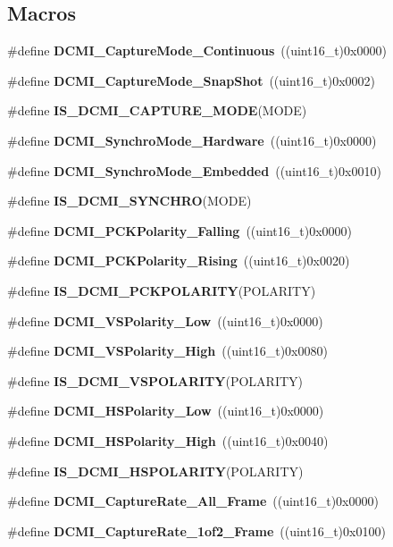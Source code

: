 \subsection*{Macros}
\begin{DoxyCompactItemize}
\item 
\#define \textbf{ D\+C\+M\+I\+\_\+\+Capture\+Mode\+\_\+\+Continuous}~((uint16\+\_\+t)0x0000)
\item 
\#define \textbf{ D\+C\+M\+I\+\_\+\+Capture\+Mode\+\_\+\+Snap\+Shot}~((uint16\+\_\+t)0x0002)
\item 
\#define \textbf{ I\+S\+\_\+\+D\+C\+M\+I\+\_\+\+C\+A\+P\+T\+U\+R\+E\+\_\+\+M\+O\+DE}(M\+O\+DE)
\item 
\#define \textbf{ D\+C\+M\+I\+\_\+\+Synchro\+Mode\+\_\+\+Hardware}~((uint16\+\_\+t)0x0000)
\item 
\#define \textbf{ D\+C\+M\+I\+\_\+\+Synchro\+Mode\+\_\+\+Embedded}~((uint16\+\_\+t)0x0010)
\item 
\#define \textbf{ I\+S\+\_\+\+D\+C\+M\+I\+\_\+\+S\+Y\+N\+C\+H\+RO}(M\+O\+DE)
\item 
\#define \textbf{ D\+C\+M\+I\+\_\+\+P\+C\+K\+Polarity\+\_\+\+Falling}~((uint16\+\_\+t)0x0000)
\item 
\#define \textbf{ D\+C\+M\+I\+\_\+\+P\+C\+K\+Polarity\+\_\+\+Rising}~((uint16\+\_\+t)0x0020)
\item 
\#define \textbf{ I\+S\+\_\+\+D\+C\+M\+I\+\_\+\+P\+C\+K\+P\+O\+L\+A\+R\+I\+TY}(P\+O\+L\+A\+R\+I\+TY)
\item 
\#define \textbf{ D\+C\+M\+I\+\_\+\+V\+S\+Polarity\+\_\+\+Low}~((uint16\+\_\+t)0x0000)
\item 
\#define \textbf{ D\+C\+M\+I\+\_\+\+V\+S\+Polarity\+\_\+\+High}~((uint16\+\_\+t)0x0080)
\item 
\#define \textbf{ I\+S\+\_\+\+D\+C\+M\+I\+\_\+\+V\+S\+P\+O\+L\+A\+R\+I\+TY}(P\+O\+L\+A\+R\+I\+TY)
\item 
\#define \textbf{ D\+C\+M\+I\+\_\+\+H\+S\+Polarity\+\_\+\+Low}~((uint16\+\_\+t)0x0000)
\item 
\#define \textbf{ D\+C\+M\+I\+\_\+\+H\+S\+Polarity\+\_\+\+High}~((uint16\+\_\+t)0x0040)
\item 
\#define \textbf{ I\+S\+\_\+\+D\+C\+M\+I\+\_\+\+H\+S\+P\+O\+L\+A\+R\+I\+TY}(P\+O\+L\+A\+R\+I\+TY)
\item 
\#define \textbf{ D\+C\+M\+I\+\_\+\+Capture\+Rate\+\_\+\+All\+\_\+\+Frame}~((uint16\+\_\+t)0x0000)
\item 
\#define \textbf{ D\+C\+M\+I\+\_\+\+Capture\+Rate\+\_\+1of2\+\_\+\+Frame}~((uint16\+\_\+t)0x0100)

\end{DoxyCompactItemize}
